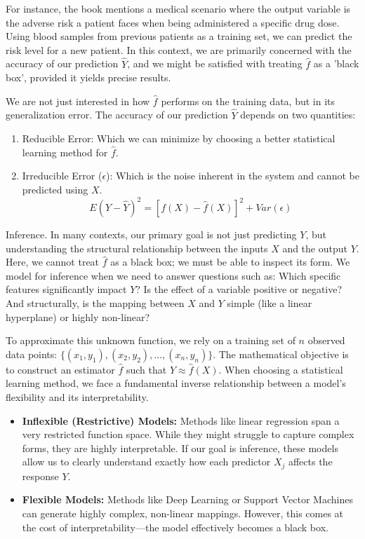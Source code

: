 \documentclass[12pt]{report}
\begin{document}
For instance, the book mentions a medical scenario where the output variable is the adverse risk a patient faces when being administered a specific drug dose. Using blood samples from previous patients as a training set, we can predict the risk level for a new patient. In this context, we are primarily concerned with the accuracy of our prediction $\hat{Y}$, and we might be satisfied with treating $\hat{f}$ as a 'black box', provided it yields precise results.

We are not just interested in how $\hat{f}$ performs on the training data, but in its generalization error. The accuracy of our prediction $\hat{Y}$ depends on two quantities:
\begin{enumerate}
\item Reducible Error: Which we can minimize by choosing a better statistical learning method for $\hat{f}$.
\item Irreducible Error ($\epsilon$): Which is the noise inherent in the system and cannot be predicted using $X$.$$E(Y - \hat{Y})^2 = [f(X) - \hat{f}(X)]^2 + Var(\epsilon)$$
\end{enumerate}

{\color{codeblue} Inference.} In many contexts, our primary goal is not just predicting $Y$, but understanding the structural relationship between the inputs $X$ and the output $Y$. Here, we cannot treat $\hat{f}$ as a black box; we must be able to inspect its form. We model for inference when we need to answer questions such as: Which specific features significantly impact $Y$? Is the effect of a variable positive or negative? And structurally, is the mapping between $X$ and $Y$ simple (like a linear hyperplane) or highly non-linear?

\bigskip

To approximate this unknown function, we rely on a training set of $n$ observed data points: $\{(x_1, y_1), (x_2, y_2), \dots, (x_n, y_n)\}$. The mathematical objective is to construct an estimator $\hat{f}$ such that $Y \approx \hat{f}(X)$. When choosing a statistical learning method, we face a fundamental inverse relationship between a model's flexibility and its interpretability.
\begin{itemize}\item \textbf{Inflexible (Restrictive) Models:} Methods like linear regression span a very restricted function space. While they might struggle to capture complex forms, they are highly interpretable. If our goal is inference, these models allow us to clearly understand exactly how each predictor $X_j$ affects the response $Y$.
\item \textbf{Flexible Models:} Methods like Deep Learning or Support Vector Machines can generate highly complex, non-linear mappings. However, this comes at the cost of interpretability—the model effectively becomes a black box.
\end{itemize}
\end{document}
